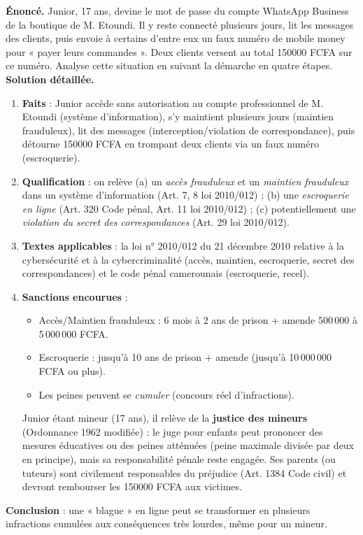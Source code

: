 \documentclass[11pt]{article}
\begin{document}
\begin{exoresolu}
\textbf{Énoncé.} Junior, 17 ans, devine le mot de passe du compte WhatsApp Business de la boutique de M. Etoundi. Il y reste connecté plusieurs jours, lit les messages des clients, puis envoie à certains d'entre eux un faux numéro de mobile money pour « payer leurs commandes ». Deux clients versent au total \num{150000} FCFA sur ce numéro. Analyse cette situation en suivant la démarche en quatre étapes.
\tcblower
\textbf{Solution détaillée.}
\begin{enumerate}
  \item \textbf{Faits} : Junior accède sans autorisation au compte professionnel de M. Etoundi (système d'information), s'y maintient plusieurs jours (maintien frauduleux), lit des messages (interception/violation de correspondance), puis détourne \num{150000} FCFA en trompant deux clients via un faux numéro (escroquerie).
  \item \textbf{Qualification} : on relève (a) un \emph{accès frauduleux} et un \emph{maintien frauduleux} dans un système d'information (Art. 7, 8 loi 2010/012) ; (b) une \emph{escroquerie en ligne} (Art. 320 Code pénal, Art. 11 loi 2010/012) ; (c) potentiellement une \emph{violation du secret des correspondances} (Art. 29 loi 2010/012).
  \item \textbf{Textes applicables} : la loi n° 2010/012 du 21 décembre 2010 relative à la cybersécurité et à la cybercriminalité (accès, maintien, escroquerie, secret des correspondances) et le code pénal camerounais (escroquerie, recel).
  \item \textbf{Sanctions encourues} :
  \begin{itemize}
    \item Accès/Maintien frauduleux : 6 mois à 2 ans de prison + amende 500\,000 à 5\,000\,000 FCFA.
    \item Escroquerie : jusqu'à 10 ans de prison + amende (jusqu'à 10\,000\,000 FCFA ou plus).
    \item Les peines peuvent se \emph{cumuler} (concours réel d'infractions).
  \end{itemize}
  Junior étant mineur (17 ans), il relève de la \textbf{justice des mineurs} (Ordonnance 1962 modifiée) : le juge pour enfants peut prononcer des mesures éducatives ou des peines atténuées (peine maximale divisée par deux en principe), mais sa responsabilité pénale reste engagée. Ses parents (ou tuteurs) sont civilement responsables du préjudice (Art. 1384 Code civil) et devront rembourser les \num{150000} FCFA aux victimes.
\end{enumerate}
\textbf{Conclusion} : une « blague » en ligne peut se transformer en plusieurs infractions cumulées aux conséquences très lourdes, même pour un mineur.
\end{exoresolu}
\end{document}

